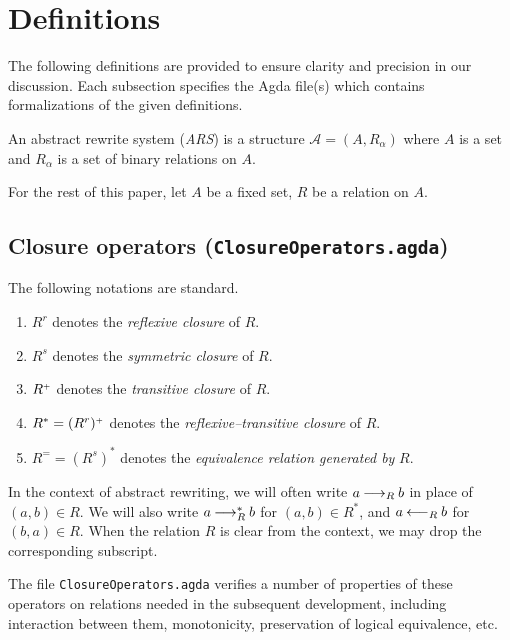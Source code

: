 \section{Definitions}
\label{sec:Definitions}
The following definitions are provided to ensure clarity and precision
in our discussion. Each subsection specifies the Agda file(s) which contains formalizations of the given definitions.

\begin{definition}
    An abstract rewrite system (\emph{ARS}) is a structure $\mathcal{A} = (A, R_\alpha)$ where
     $A$ is a set and $R_\alpha$ is a set of binary relations on $A$.
\end{definition}

For the rest of this paper, let $A$ be a fixed set, $R$ be a relation on $A$.



\subsection{Closure operators (\texttt{ClosureOperators.agda})}

\begin{notation}
The following notations are standard.
  \begin{enumerate}
    \item $R^r$ denotes the \emph{reflexive closure} of $R$.
    \item $R^s$ denotes the \emph{symmetric closure} of $R$.
    \item ${R}^{\scriptscriptstyle{+}}$ denotes the \emph{transitive closure} of $R$.
    \item $R^* = (R^r){}^{\scriptscriptstyle{+}}$ denotes the \emph{reflexive--transitive closure} of $R$.
    \item $R^= = (R^s)^*$ denotes the \emph{equivalence relation generated by} $R$.
  \end{enumerate}
\end{notation}

In the context of abstract rewriting, we will often write $a \mathbin{\longrightarrow_R} b$
in place of $(a,b) \in R$.  We will also write $a \mathbin{\longrightarrow_R^*} b$ for $(a,b) \in R^*$, and
$a \mathbin{\longleftarrow_R} b$ for $(b,a) \in R$.  When the relation $R$ is clear from the context,
we may drop the corresponding subscript.

The file \texttt{ClosureOperators.agda} verifies a number of properties of these operators
on relations needed in the subsequent development, including interaction between them,
monotonicity, preservation of logical equivalence, etc.

